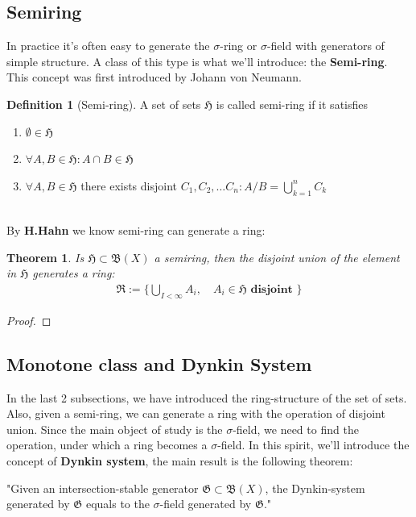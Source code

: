 \documentclass[a4paper,11pt,oneside,fleqn]{book}
\newtheorem{theorem}{Theorem}[section]
\theoremstyle{definition}
\newtheorem{definition}{Definition}[section]
\theoremstyle{remark}
\begin{document}
\subsection{Semiring}
In practice it's often easy to generate the $\sigma$-ring or $\sigma$-field with generators of simple structure. A class of this type is what we'll introduce: the \textbf{Semi-ring}. This concept was first introduced by Johann von Neumann.
\begin{definition}[Semi-ring]
 A set of sets $\mathfrak{H}$ is called semi-ring if it satisfies
 \begin{enumerate}
 	\item $\emptyset \in \mathfrak{H}$
 	\item $\forall A, B \in \mathfrak{H}: A \cap B \in \mathfrak{H}$
 	\item $\forall A, B \in \mathfrak{H}$ there exists disjoint $C_1, C_2, \dots C_n: A\slash B = \bigcup_{k = 1}^n C_k$
 \end{enumerate}
\end{definition}
$\quad$\\
By \textbf{H.Hahn} we know semi-ring can generate a ring:
\begin{theorem}
	Is $\mathfrak{H} \subset \mathfrak{B}(X)$ a semiring, then the disjoint union of the element in $\mathfrak{H}$ generates a ring:
	\begin{align*}
		\mathfrak{R} := \{ \bigcup_{I < \infty} A_i,\quad \textbf{$A_i\in \mathfrak{H}$ disjoint } \} 
	\end{align*}
\end{theorem}
\begin{proof}
\end{proof}


\subsection{Monotone class and Dynkin System}
In the last 2 subsections, we have introduced the ring-structure of the set of sets. Also, given a semi-ring, we can generate a ring with the operation of disjoint union. Since the main object of study is the $\sigma$-field, we need to find the operation, under which a ring becomes a $\sigma$-field. In this spirit, we'll introduce the concept of \textbf{Dynkin system}, the main result is the following theorem:

	"Given an intersection-stable generator $\mathfrak{G} \subset \mathfrak{B}(X)$, the Dynkin-system generated by $\mathfrak{G}$ equals to the $\sigma$-field generated by $\mathfrak{G}$."
	 
\end{document}
